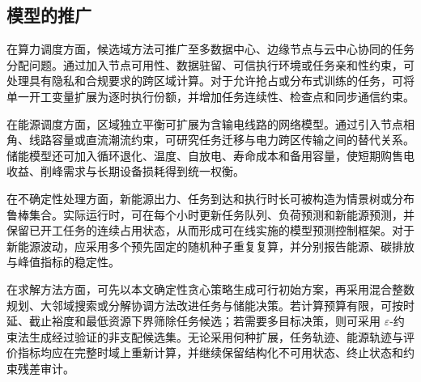 \subsection{模型的推广}

在算力调度方面，候选域方法可推广至多数据中心、边缘节点与云中心协同的任务分配问题。通过加入节点可用性、数据驻留、可信执行环境或任务亲和性约束，可处理具有隐私和合规要求的跨区域计算。对于允许抢占或分布式训练的任务，可将单一开工变量扩展为逐时执行份额，并增加任务连续性、检查点和同步通信约束。

在能源调度方面，区域独立平衡可扩展为含输电线路的网络模型。通过引入节点相角、线路容量或直流潮流约束，可研究任务迁移与电力跨区传输之间的替代关系。储能模型还可加入循环退化、温度、自放电、寿命成本和备用容量，使短期购售电收益、削峰需求与长期设备损耗得到统一权衡。

在不确定性处理方面，新能源出力、任务到达和执行时长可被构造为情景树或分布鲁棒集合。实际运行时，可在每个小时更新任务队列、负荷预测和新能源预测，并保留已开工任务的连续占用状态，从而形成可在线实施的模型预测控制框架\cite{rawlings2017model}。对于新能源波动，应采用多个预先固定的随机种子重复复算，并分别报告能源、碳排放与峰值指标的稳定性。

在求解方法方面，可先以本文确定性贪心策略生成可行初始方案，再采用混合整数规划、大邻域搜索或分解协调方法改进任务与储能决策。若计算预算有限，可按时延、截止裕度和最低资源下界筛除任务候选；若需要多目标决策，则可采用 $\varepsilon$-约束法生成经过验证的非支配候选集\cite{miettinen1999nonlinear}。无论采用何种扩展，任务轨迹、能源轨迹与评价指标均应在完整时域上重新计算，并继续保留结构化不可用状态、终止状态和约束残差审计。
